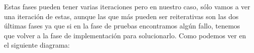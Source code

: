\documentclass[a4paper,11pt, twoside]{article}
\begin{document}
Estas fases pueden tener varias iteraciones pero en nuestro caso, sólo vamos a ver una iteración de estas, aunque las que más pueden ser reiterativas son las dos últimas fases ya que si en la fase de pruebas encontramos algún fallo, tenemos que volver a la fase de implementación para solucionarlo. Como podemos ver en el siguiente diagrama:
    \begin{figure}[h]
                \centering
            \end{figure}        
            
            \newpage
\end{document}
